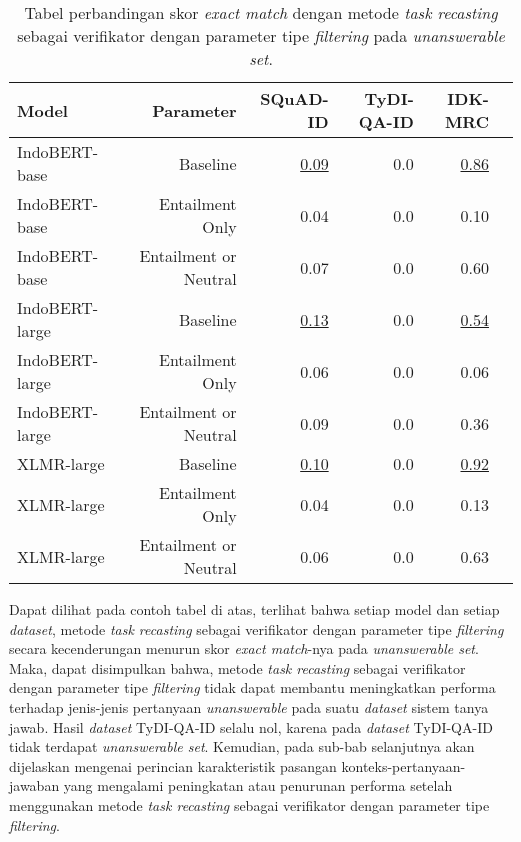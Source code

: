 \begin{table}[H]\centering
\begin{tabular}{lrrrrr}\toprule
Model &Parameter &SQuAD-ID &TyDI-QA-ID &IDK-MRC \\\midrule
IndoBERT-base &Baseline &\underline{0.09} &0.0 &\underline{0.86} \\
IndoBERT-base &Entailment Only &0.04 &0.0 &0.10 \\
IndoBERT-base &Entailment or Neutral &0.07 &0.0 &0.60 \\
\hline
IndoBERT-large &Baseline &\underline{0.13} &0.0 &\underline{0.54} \\
IndoBERT-large &Entailment Only &0.06 &0.0 &0.06 \\
IndoBERT-large &Entailment or Neutral &0.09 &0.0 &0.36 \\
\hline
XLMR-large &Baseline &\underline{0.10} &0.0 &\underline{0.92} \\
XLMR-large &Entailment Only &0.04 &0.0 &0.13 \\
XLMR-large &Entailment or Neutral &0.06 &0.0 &0.63 \\
\bottomrule
\end{tabular}
\caption{Tabel perbandingan skor \emph{exact match} dengan metode \emph{task recasting} sebagai verifikator dengan parameter tipe \emph{filtering} pada \emph{unanswerable set}.}
\end{table}

Dapat dilihat pada contoh tabel di atas, terlihat bahwa setiap model dan setiap \emph{dataset}, metode \emph{task recasting} sebagai verifikator dengan parameter tipe \emph{filtering} secara kecenderungan menurun skor \emph{exact match}-nya pada \emph{unanswerable set}. Maka, dapat disimpulkan bahwa, metode \emph{task recasting} sebagai verifikator dengan parameter tipe \emph{filtering} tidak dapat membantu meningkatkan performa terhadap jenis-jenis pertanyaan \emph{unanswerable} pada suatu \emph{dataset} sistem tanya jawab. Hasil \emph{dataset} TyDI-QA-ID selalu nol, karena pada \emph{dataset} TyDI-QA-ID tidak terdapat \emph{unanswerable set}. Kemudian, pada sub-bab selanjutnya akan dijelaskan mengenai perincian karakteristik pasangan konteks-pertanyaan-jawaban yang mengalami peningkatan atau penurunan performa setelah menggunakan metode \emph{task recasting} sebagai verifikator dengan parameter tipe \emph{filtering}.

